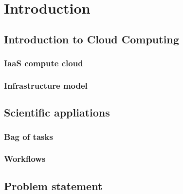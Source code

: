 \chapter{Introduction}
\label{chap:introduction} 


\section{Introduction to Cloud Computing}



\subsection{IaaS compute cloud}

\subsection{Infrastructure model}

\section{Scientific appliations}

\subsection{Bag of tasks}

\subsection{Workflows}

\section{Problem statement}

